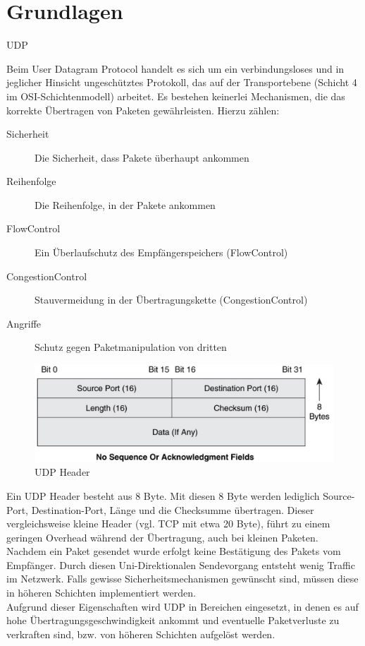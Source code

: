 \chapter{Grundlagen}
\label{ch:Grundlagen}


UDP

Beim User Datagram Protocol handelt es sich um ein verbindungsloses und in jeglicher Hinsicht ungeschütztes Protokoll, das auf der Transportebene (Schicht 4 im OSI-Schichtenmodell) arbeitet. Es bestehen keinerlei Mechanismen, die das korrekte Übertragen von Paketen gewährleisten. Hierzu zählen:

\begin{description}
	\item[Sicherheit] Die Sicherheit, dass Pakete überhaupt ankommen
	\item[Reihenfolge] Die Reihenfolge, in der Pakete ankommen
	\item[FlowControl] Ein Überlaufschutz des Empfängerspeichers (FlowControl)
	\item[CongestionControl] Stauvermeidung in der Übertragungskette (CongestionControl)
	\item[Angriffe] Schutz gegen Paketmanipulation von dritten
\end{description}

\begin{figure}
\includegraphics[width=\textwidth]{images/UDP_header.pdf}
\caption{UDP Header}
\label{fig:udp_header}
\end{figure}

Ein UDP Header besteht aus 8 Byte. Mit diesen 8 Byte werden lediglich Source-Port, Destination-Port, Länge und die Checksumme übertragen. Dieser vergleichsweise kleine Header (vgl. TCP mit etwa 20 Byte), führt zu einem geringen Overhead während der Übertragung, auch bei kleinen Paketen. Nachdem ein Paket gesendet wurde erfolgt keine Bestätigung des Pakets vom Empfänger. Durch diesen Uni-Direktionalen Sendevorgang entsteht wenig Traffic im Netzwerk. Falls gewisse Sicherheitsmechanismen gewünscht sind, müssen diese in höheren Schichten implementiert werden. \\
Aufgrund dieser Eigenschaften wird UDP in Bereichen eingesetzt, in denen es auf hohe Übertragungsgeschwindigkeit ankommt und eventuelle Paketverluste zu verkraften sind, bzw. von höheren Schichten aufgelöst werden.




